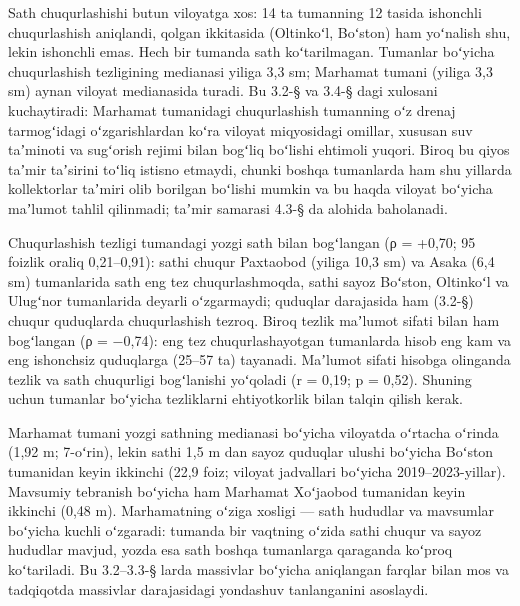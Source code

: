 Sath chuqurlashishi butun viloyatga xos: 14 ta tumanning 12 tasida
ishonchli chuqurlashish aniqlandi, qolgan ikkitasida (Oltinkoʻl,
Boʻston) ham yoʻnalish shu, lekin ishonchli emas. Hech bir tumanda sath
koʻtarilmagan. Tumanlar boʻyicha chuqurlashish tezligining medianasi
yiliga 3,3 sm; Marhamat tumani (yiliga 3,3 sm) aynan viloyat medianasida
turadi. Bu 3.2-§ va 3.4-§ dagi xulosani kuchaytiradi: Marhamat
tumanidagi chuqurlashish tumanning oʻz drenaj tarmogʻidagi
oʻzgarishlardan koʻra viloyat miqyosidagi omillar, xususan suv taʼminoti
va sugʻorish rejimi bilan bogʻliq boʻlishi ehtimoli yuqori. Biroq bu
qiyos taʼmir taʼsirini toʻliq istisno etmaydi, chunki boshqa tumanlarda
ham shu yillarda kollektorlar taʼmiri olib borilgan boʻlishi mumkin va
bu haqda viloyat boʻyicha maʼlumot tahlil qilinmadi; taʼmir samarasi
4.3-§ da alohida baholanadi.

Chuqurlashish tezligi tumandagi yozgi sath bilan bogʻlangan (ρ = +0,70;
95 foizlik oraliq 0,21--0,91): sathi chuqur Paxtaobod (yiliga 10,3 sm)
va Asaka (6,4 sm) tumanlarida sath eng tez chuqurlashmoqda, sathi sayoz
Boʻston, Oltinkoʻl va Ulugʻnor tumanlarida deyarli oʻzgarmaydi; quduqlar
darajasida ham (3.2-§) chuqur quduqlarda chuqurlashish tezroq. Biroq
tezlik maʼlumot sifati bilan ham bogʻlangan (ρ = −0,74): eng tez
chuqurlashayotgan tumanlarda hisob eng kam va eng ishonchsiz quduqlarga
(25--57 ta) tayanadi. Maʼlumot sifati hisobga olinganda tezlik va sath
chuqurligi bogʻlanishi yoʻqoladi (r = 0,19; p = 0,52). Shuning uchun
tumanlar boʻyicha tezliklarni ehtiyotkorlik bilan talqin qilish kerak.

Marhamat tumani yozgi sathning medianasi boʻyicha viloyatda oʻrtacha
oʻrinda (1,92 m; 7-oʻrin), lekin sathi 1,5 m dan sayoz quduqlar ulushi
boʻyicha Boʻston tumanidan keyin ikkinchi (22,9 foiz; viloyat jadvallari
boʻyicha 2019--2023-yillar). Mavsumiy tebranish boʻyicha ham Marhamat
Xoʻjaobod tumanidan keyin ikkinchi (0,48 m). Marhamatning oʻziga xosligi
--- sath hududlar va mavsumlar boʻyicha kuchli oʻzgaradi: tumanda bir
vaqtning oʻzida sathi chuqur va sayoz hududlar mavjud, yozda esa sath
boshqa tumanlarga qaraganda koʻproq koʻtariladi. Bu 3.2--3.3-§ larda
massivlar boʻyicha aniqlangan farqlar bilan mos va tadqiqotda massivlar
darajasidagi yondashuv tanlanganini asoslaydi.


